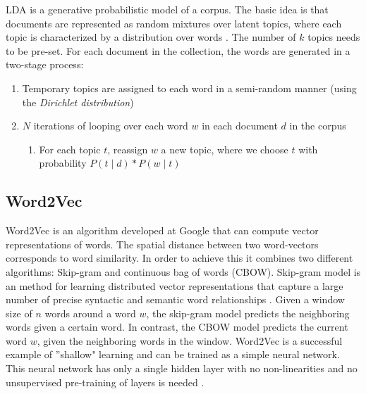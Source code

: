 LDA is a generative probabilistic model of a corpus. The basic idea is that documents are represented as random mixtures over latent topics, where each topic is characterized by a distribution over words \cite{blei2003latent}. The number of $k$ topics needs to be pre-set. For each document in the collection, the words are generated in a two-stage process:

\begin{enumerate}
\item Temporary topics are assigned to each word in a semi-random manner (using the \textit{Dirichlet distribution})
\item $N$ iterations of looping over each word $w$ in each document $d$ in the corpus
	\begin{enumerate}[label=(\alph*)]
		\item For each topic $t$, reassign $w$ a new topic, where we choose $t$ with probability $P(t \mid d) * P(w \mid t)$
	\end{enumerate}
\end{enumerate}



\subsection{Word2Vec}
Word2Vec is an algorithm developed at Google that can compute vector representations of
words. The spatial distance between two word-vectors corresponds to word similarity. In order to achieve this it combines two different algorithms: Skip-gram and continuous bag of words (CBOW). Skip-gram model is an method for learning distributed vector representations that capture a large number of precise syntactic and semantic word relationships \cite{mikolov2013distributed}. Given a window size of $n$ words around a word $w$, the skip-gram model predicts the neighboring words given a certain word. In contrast, the CBOW model predicts the current word $w$, given the neighboring words in the window. Word2Vec is a successful example of ''shallow" learning and can be trained as a simple neural network. This neural network has only a single hidden layer with no non-linearities and no unsupervised pre-training of layers is needed \cite{wang2014introduction}. 

